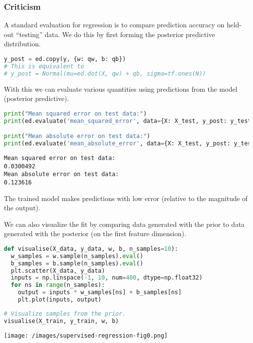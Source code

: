 \subsubsection{Criticism}

A standard evaluation for regression is to compare prediction accuracy on
held-out ``testing'' data. We do this by first forming the posterior predictive
distribution.
\begin{lstlisting}[language=Python]
y_post = ed.copy(y, {w: qw, b: qb})
# This is equivalent to
# y_post = Normal(mu=ed.dot(X, qw) + qb, sigma=tf.ones(N))
\end{lstlisting}

With this we can evaluate various quantities using predictions from
the model (posterior predictive).
\begin{lstlisting}[language=Python]
print("Mean squared error on test data:")
print(ed.evaluate('mean_squared_error', data={X: X_test, y_post: y_test}))

print("Mean absolute error on test data:")
print(ed.evaluate('mean_absolute_error', data={X: X_test, y_post: y_test}))
\end{lstlisting}

\begin{lstlisting}
Mean squared error on test data:
0.0300492
Mean absolute error on test data:
0.123616
\end{lstlisting}

The trained model makes predictions with low error
(relative to the magnitude of the output).

We can also visualize the fit by comparing data generated with the
prior to data generated with the posterior (on the first feature
dimension).

\begin{lstlisting}[language=Python]
def visualise(X_data, y_data, w, b, n_samples=10):
  w_samples = w.sample(n_samples).eval()
  b_samples = b.sample(n_samples).eval()
  plt.scatter(X_data, y_data)
  inputs = np.linspace(-1, 10, num=400, dtype=np.float32)
  for ns in range(n_samples):
    output = inputs * w_samples[ns] + b_samples[ns]
    plt.plot(inputs, output)
\end{lstlisting}

\begin{lstlisting}[language=Python]
# Visualize samples from the prior.
visualise(X_train, y_train, w, b)
\end{lstlisting}

\texttt{[image: /images/supervised-regression-fig0.png]}


